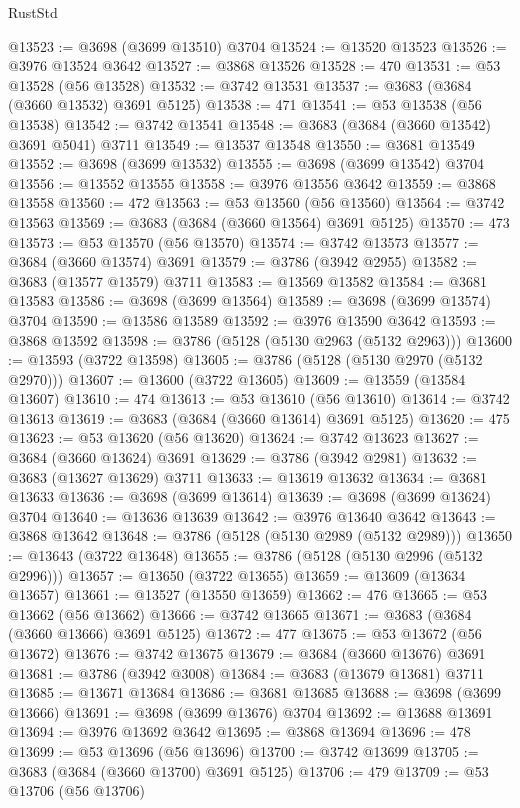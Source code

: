 \begin{lexlean}{RustStd}
\begin{coremodule}
@13523 := @3698 (@3699 @13510) @3704
@13524 := @13520 @13523
@13526 := @3976 @13524 @3642
@13527 := @3868 @13526
@13528 := 470
@13531 := @53 @13528 (@56 @13528)
@13532 := @3742 @13531
@13537 := @3683 (@3684 (@3660 @13532) @3691 @5125)
@13538 := 471
@13541 := @53 @13538 (@56 @13538)
@13542 := @3742 @13541
@13548 := @3683 (@3684 (@3660 @13542) @3691 @5041) @3711
@13549 := @13537 @13548
@13550 := @3681 @13549
@13552 := @3698 (@3699 @13532)
@13555 := @3698 (@3699 @13542) @3704
@13556 := @13552 @13555
@13558 := @3976 @13556 @3642
@13559 := @3868 @13558
@13560 := 472
@13563 := @53 @13560 (@56 @13560)
@13564 := @3742 @13563
@13569 := @3683 (@3684 (@3660 @13564) @3691 @5125)
@13570 := 473
@13573 := @53 @13570 (@56 @13570)
@13574 := @3742 @13573
@13577 := @3684 (@3660 @13574) @3691
@13579 := @3786 (@3942 @2955)
@13582 := @3683 (@13577 @13579) @3711
@13583 := @13569 @13582
@13584 := @3681 @13583
@13586 := @3698 (@3699 @13564)
@13589 := @3698 (@3699 @13574) @3704
@13590 := @13586 @13589
@13592 := @3976 @13590 @3642
@13593 := @3868 @13592
@13598 := @3786 (@5128 (@5130 @2963 (@5132 @2963)))
@13600 := @13593 (@3722 @13598)
@13605 := @3786 (@5128 (@5130 @2970 (@5132 @2970)))
@13607 := @13600 (@3722 @13605)
@13609 := @13559 (@13584 @13607)
@13610 := 474
@13613 := @53 @13610 (@56 @13610)
@13614 := @3742 @13613
@13619 := @3683 (@3684 (@3660 @13614) @3691 @5125)
@13620 := 475
@13623 := @53 @13620 (@56 @13620)
@13624 := @3742 @13623
@13627 := @3684 (@3660 @13624) @3691
@13629 := @3786 (@3942 @2981)
@13632 := @3683 (@13627 @13629) @3711
@13633 := @13619 @13632
@13634 := @3681 @13633
@13636 := @3698 (@3699 @13614)
@13639 := @3698 (@3699 @13624) @3704
@13640 := @13636 @13639
@13642 := @3976 @13640 @3642
@13643 := @3868 @13642
@13648 := @3786 (@5128 (@5130 @2989 (@5132 @2989)))
@13650 := @13643 (@3722 @13648)
@13655 := @3786 (@5128 (@5130 @2996 (@5132 @2996)))
@13657 := @13650 (@3722 @13655)
@13659 := @13609 (@13634 @13657)
@13661 := @13527 (@13550 @13659)
@13662 := 476
@13665 := @53 @13662 (@56 @13662)
@13666 := @3742 @13665
@13671 := @3683 (@3684 (@3660 @13666) @3691 @5125)
@13672 := 477
@13675 := @53 @13672 (@56 @13672)
@13676 := @3742 @13675
@13679 := @3684 (@3660 @13676) @3691
@13681 := @3786 (@3942 @3008)
@13684 := @3683 (@13679 @13681) @3711
@13685 := @13671 @13684
@13686 := @3681 @13685
@13688 := @3698 (@3699 @13666)
@13691 := @3698 (@3699 @13676) @3704
@13692 := @13688 @13691
@13694 := @3976 @13692 @3642
@13695 := @3868 @13694
@13696 := 478
@13699 := @53 @13696 (@56 @13696)
@13700 := @3742 @13699
@13705 := @3683 (@3684 (@3660 @13700) @3691 @5125)
@13706 := 479
@13709 := @53 @13706 (@56 @13706)

\end{coremodule}
\end{lexlean}
